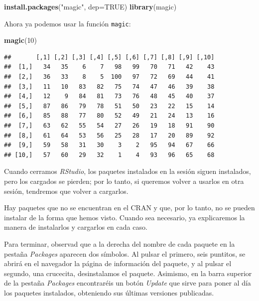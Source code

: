 \documentclass[]{book}
\newenvironment{Shaded}{\begin{snugshade}}{\end{snugshade}}
\newcommand{\DataTypeTok}[1]{\textcolor[rgb]{0.13,0.29,0.53}{#1}}
\newcommand{\DecValTok}[1]{\textcolor[rgb]{0.00,0.00,0.81}{#1}}
\newcommand{\KeywordTok}[1]{\textcolor[rgb]{0.13,0.29,0.53}{\textbf{#1}}}
\newcommand{\NormalTok}[1]{#1}
\newcommand{\OtherTok}[1]{\textcolor[rgb]{0.56,0.35,0.01}{#1}}
\newcommand{\StringTok}[1]{\textcolor[rgb]{0.31,0.60,0.02}{#1}}
\theoremstyle{definition}
\theoremstyle{definition}
\theoremstyle{definition}
\theoremstyle{remark}
\begin{document}
\begin{Shaded}
\begin{Highlighting}[]
\KeywordTok{install.packages}\NormalTok{(}\StringTok{"magic"}\NormalTok{, }\DataTypeTok{dep=}\OtherTok{TRUE}\NormalTok{)}
\KeywordTok{library}\NormalTok{(magic)}
\end{Highlighting}
\end{Shaded}

Ahora ya podemos usar la función \texttt{magic}:

\begin{Shaded}
\begin{Highlighting}[]
\KeywordTok{magic}\NormalTok{(}\DecValTok{10}\NormalTok{)}
\end{Highlighting}
\end{Shaded}

\begin{verbatim}
##       [,1] [,2] [,3] [,4] [,5] [,6] [,7] [,8] [,9] [,10]
##  [1,]   34   35    6    7   98   99   70   71   42    43
##  [2,]   36   33    8    5  100   97   72   69   44    41
##  [3,]   11   10   83   82   75   74   47   46   39    38
##  [4,]   12    9   84   81   73   76   48   45   40    37
##  [5,]   87   86   79   78   51   50   23   22   15    14
##  [6,]   85   88   77   80   52   49   21   24   13    16
##  [7,]   63   62   55   54   27   26   19   18   91    90
##  [8,]   61   64   53   56   25   28   17   20   89    92
##  [9,]   59   58   31   30    3    2   95   94   67    66
## [10,]   57   60   29   32    1    4   93   96   65    68
\end{verbatim}

Cuando cerramos \emph{RStudio}, los paquetes instalados en la sesión siguen instalados, pero los cargados se pierden; por lo tanto, si queremos volver a usarlos en otra sesión, tendremos que volver a cargarlos.

Hay paquetes que no se encuentran en el CRAN y que, por lo tanto, no se pueden instalar de la forma que hemos visto. Cuando sea necesario, ya explicaremos la manera de instalarlos y cargarlos en cada caso.

Para terminar, observad que a la derecha del nombre de cada paquete en la pestaña \emph{Packages} aparecen dos símbolos. Al pulsar el primero, seis puntitos, se abrirá en el navegador la página de información del paquete, y al pulsar el segundo, una crucecita, desinstalamos el paquete. Asimismo, en la barra superior de la pestaña \emph{Packages} encontraréis un botón \emph{Update} que sirve para poner al día los paquetes instalados, obteniendo sus últimas versiones publicadas.
\end{document}
